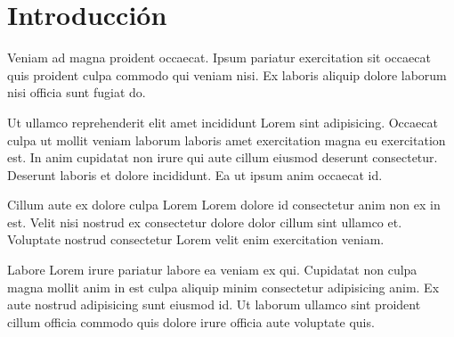 \chapter{Introducción}

Veniam ad magna proident occaecat. Ipsum pariatur exercitation sit occaecat quis proident culpa commodo qui veniam nisi. Ex laboris aliquip dolore laborum nisi officia sunt fugiat do.

Ut ullamco reprehenderit elit amet incididunt Lorem sint adipisicing. Occaecat culpa ut mollit veniam laborum laboris amet exercitation magna eu exercitation est. In anim cupidatat non irure qui aute cillum eiusmod deserunt consectetur. Deserunt laboris et dolore incididunt. Ea ut ipsum anim occaecat id.

Cillum aute ex dolore culpa Lorem Lorem dolore id consectetur anim non ex in est. Velit nisi nostrud ex consectetur dolore dolor cillum sint ullamco et. Voluptate nostrud consectetur Lorem velit enim exercitation veniam.

Labore Lorem irure pariatur labore ea veniam ex qui. Cupidatat non culpa magna mollit anim in est culpa aliquip minim consectetur adipisicing anim. Ex aute nostrud adipisicing sunt eiusmod id. Ut laborum ullamco sint proident cillum officia commodo quis dolore irure officia aute voluptate quis.
